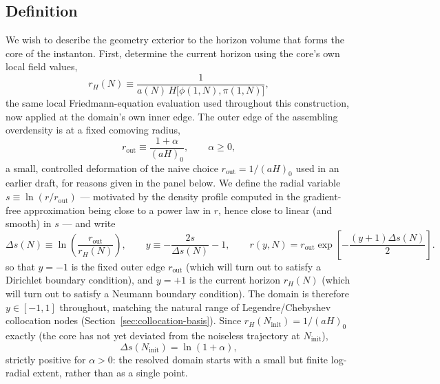 \documentclass[a4paper,11pt]{article}
\renewcommand{\geq}{\geqslant}
\newcommand{\Ny}{N}                          %
\newcommand{\Ninit}{N_{\mathrm{init}}}       %
\newcommand{\Hub}{H}                         %
\newcommand{\sfactor}{a}                     %
\newcommand{\field}{\phi}                    %
\newcommand{\mom}{\pi}                       %
\newcommand{\rad}{r}                         %
\newcommand{\yco}{y}                         %
\newcommand{\rout}{\rad_{\mathrm{out}}}      %
\newcommand{\aHo}{(\sfactor \Hub)_0}         %
\newcommand{\rH}{\rad_H}                     %
\newcommand{\Deltas}{\Delta s}                %
\begin{document}
\subsection{Definition}

We wish to describe the geometry exterior to the horizon
volume that forms the core of the instanton.
First, determine
the current horizon using the core's own local field
values,
\begin{equation}
    \rH(\Ny) \equiv \frac{1}{a(\Ny)\,\Hub\big[\field(1,\Ny),\mom(1,\Ny)\big]} ,
    \label{eq:rH-definition}
\end{equation}
the same local Friedmann-equation evaluation used throughout this
construction, now applied at the domain's own inner edge. The outer edge
of the assembling overdensity is at a fixed comoving radius,
\begin{equation}
    \rout \equiv \frac{1+\alpha}{\aHo} ,
    \qquad \alpha \geq 0 ,
    \label{eq:rout-alpha}
\end{equation}
a small, controlled deformation of the naive choice $\rout=1/\aHo$ used in
an earlier draft, for reasons given in the panel below. We define the
radial variable $s \equiv \ln(\rad/\rout)$ --- motivated by the density
profile computed in the gradient-free approximation being close to a
power law in $\rad$, hence close to linear (and smooth) in $s$ --- and
write
\begin{equation}
    \Deltas(\Ny) \equiv \ln\!\left(\frac{\rout}{\rH(\Ny)}\right) ,
    \qquad
    \yco \equiv -\frac{2s}{\Deltas(\Ny)} - 1 ,
    \qquad
    \rad(\yco,\Ny) = \rout \exp\!\left[-\frac{(\yco+1)\Deltas(\Ny)}{2}\right] .
    \label{eq:y-definition}
\end{equation}
so that $\yco=-1$ is the fixed outer edge $\rout$ (which
will turn out to satisfy
a Dirichlet boundary condition),
and $\yco=+1$ is the current horizon $\rH(\Ny)$ (which
will turn out to satisfy
a Neumann boundary condition). The
domain is therefore $\yco\in[-1,1]$ throughout, matching the natural range
of Legendre/Chebyshev collocation nodes (Section~\ref{sec:collocation-basis}).
Since $\rH(\Ninit)=1/\aHo$ exactly (the core has not yet deviated from the
noiseless trajectory at $\Ninit$),
\begin{equation}
    \Deltas(\Ninit) = \ln(1+\alpha) ,
    \label{eq:Deltas-init}
\end{equation}
strictly positive for $\alpha>0$: the resolved domain starts with a small
but finite log-radial extent, rather than as a single point.
\end{document}
